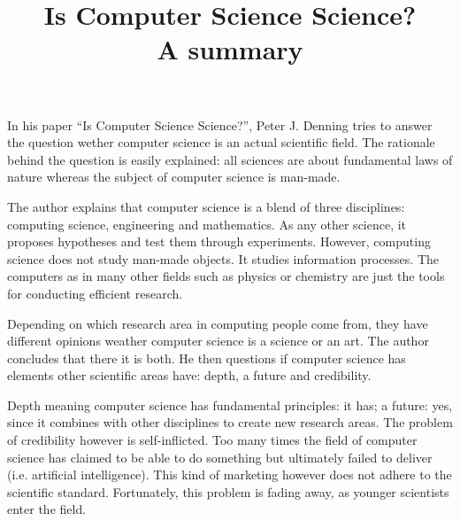 \documentclass[a4paper,12pt,english]{scrartcl}
\title{Is Computer Science Science? \\ {\large A summary}}
\begin{document}
\maketitle

\thispagestyle{empty}
\pagestyle{empty}

In his paper \enquote{Is Computer Science Science?}, Peter J. Denning tries
to answer the question wether computer science is an actual scientific field.
The rationale behind the question is easily explained: all sciences are about
fundamental laws of nature whereas the subject of computer science is
man-made.

The author explains that computer science is a blend of three disciplines:
computing science, engineering and mathematics. As any other science, it
proposes hypotheses and test them through experiments. However, computing
science does not study man-made objects. It studies information processes.
The computers \textemdash{} as in many other fields such as physics or chemistry
\textemdash{} are just the tools for conducting efficient research.

Depending on which research area in computing people come from, they have
different opinions weather computer science is a science or an art. The author
concludes that there it is both. He then questions if computer science has
elements other scientific areas have: depth, a future and credibility.

Depth meaning computer science has fundamental principles: it has; a future:
yes, since it combines with other disciplines to create new research areas.
The problem of credibility however is self-inflicted. Too many times the field
of computer science has claimed to be able to do something but ultimately
failed to deliver (i.e. artificial intelligence). This kind of marketing
however does not adhere to the scientific standard. Fortunately, this problem
is fading away, as younger scientists enter the field.
\end{document}
